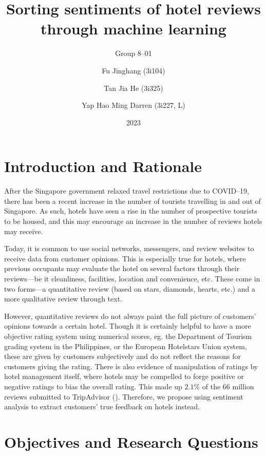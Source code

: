 \documentclass[12pt,bibliography=totocnumbered]{scrartcl}
\title{Sorting sentiments of hotel reviews through machine learning}
\subtitle{Group 8--01}
\author{
	Fu Jinghang (3i104) \and
	Tan Jia He (3i325) \and
	Yap Hao Ming Darren (3i227, L)
}
\date{2023}
\begin{document}
\pagestyle{scrheadings}
\onehalfspacing

\maketitle
\pagebreak

\begin{singlespace}
	\tableofcontents
\end{singlespace}

\pagebreak

\section{Introduction and Rationale}
After the Singapore government relaxed travel restrictions due to COVID--19,
there has been a recent increase in the number of tourists travelling in and out of Singapore.
As such, hotels have seen a rise in the number of prospective tourists to be housed,
and this may encourage an increase in the number of reviews hotels may receive.

Today, it is common to use social networks, messengers, and review websites
to receive data from customer opinions. This is especially true for hotels,
where previous occupants may evaluate the hotel on several factors through their
reviews---be it cleanliness, facilities, location and convenience, etc.
These come in two forms---a quantitative review (based on stars, diamonds, hearts, etc.)
and a more qualitative review through text.

However, quantitative reviews do not always paint the full picture of customers'
opinions towards a certain hotel. Though it is certainly helpful to have a more
objective rating system using numerical scores, eg. the Department of Tourism grading system in
the Philippines, or the European Hotelstars Union system,
these are given by customers subjectively and do not reflect the reasons for customers giving the rating.
There is also evidence of manipulation of ratings by hotel management itself, where hotels may be
compelled to forge positive or negative ratings to bias the overall rating.
This made up $2.1\%$ of the $66$ million reviews submitted to TripAdvisor (\cite{tripadvisor}).
Therefore, we propose using sentiment analysis to extract customers' true feedback on hotels instead.

\section{Objectives and Research Questions}
\end{document}
